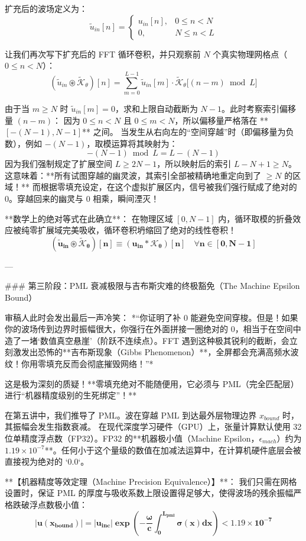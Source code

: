 \documentclass[12pt]{article}
\begin{document}
{扩充后的波场定义为：
$$
\tilde{u}_{in}[n] = 
\begin{cases} 
u_{in}[n], & 0 \le n < N \\
0, & N \le n < L 
\end{cases}
$$

让我们再次写下扩充后的 FFT 循环卷积，并只观察前 $N$ 个真实物理网格点（$0 \le n < N$）：
$$ (\tilde{u}_{in} \circledast \tilde{\mathcal{K}}_\theta)[n] = \sum_{m=0}^{L-1} \tilde{u}_{in}[m] \cdot \tilde{\mathcal{K}}_\theta\big[ (n - m) \bmod L \big] $$

由于当 $m \ge N$ 时 $\tilde{u}_{in}[m] = 0$，求和上限自动截断为 $N-1$。此时考察索引偏移量 $(n-m)$：
因为 $0 \le n < N$ 且 $0 \le m < N$，所以偏移量严格落在 **$[-(N-1), N-1]$** 之间。
当发生从右向左的“空间穿越”时（即偏移量为负数），例如 $-(N-1)$，取模运算将其映射为：
$$ -(N-1) \bmod L = L - (N-1) $$
因为我们强制规定了扩展空间 $L \ge 2N-1$，所以映射后的索引 $L - N + 1 \ge N$。这意味着：**所有试图穿越的幽灵波，其索引全部被精确地重定向到了 $\ge N$ 的区域！**
而根据零填充设定，在这个虚拟扩展区内，信号被我们强行赋成了绝对的 $0$。穿越回来的幽灵与 $0$ 相乘，瞬间湮灭！

**数学上的绝对等式在此确立**：
在物理区域 $[0, N-1]$ 内，循环取模的折叠效应被纯零扩展域完美吸收，循环卷积坍缩回了绝对的线性卷积！
$$ \mathbf{(\tilde{u}_{in} \circledast \tilde{\mathcal{K}}_\theta)[n] \equiv (u_{in} * \mathcal{K}_\theta)[n] \quad \forall n \in [0, N-1]} $$

---

### 第三阶段：PML 衰减极限与吉布斯灾难的终极豁免（The Machine Epsilon Bound）

审稿人此时会发出最后一声冷笑：
*“你证明了补 0 能避免空间穿梭。但是！如果你的波场传到边界时振幅很大，你强行在外面拼接一圈绝对的 0，相当于在空间中造了一堵‘数值真空悬崖’（阶跃不连续点）。FFT 遇到这种极其锐利的截断，会立刻激发出恐怖的**吉布斯现象（Gibbs Phenomenon）**，全屏都会充满高频水波纹！你用零填充反而会彻底摧毁网络！”*

这是极为深刻的质疑！**零填充绝对不能随便用，它必须与 PML（完全匹配层）进行“机器精度级别的生死绑定”！**

在第五讲中，我们推导了 PML。波在穿越 PML 到达最外层物理边界 $x_{bound}$ 时，其振幅会发生指数衰减。
在现代深度学习硬件（GPU）上，张量计算默认使用 32 位单精度浮点数（FP32）。FP32 的**机器极小值（Machine Epsilon，$\epsilon_{mach}$）约为 $1.19 \times 10^{-7}$**。任何小于这个量级的数值在加减法运算中，在计算机硬件底层会被直接视为绝对的 `0.0`。

**【机器精度等效定理（Machine Precision Equivalence）】**：
我们只需在网格设置时，保证 PML 的厚度与吸收系数上限设置得足够大，使得波场的残余振幅严格跌破浮点数极小值：
$$ \mathbf{|u(x_{bound})| = |u_{inc}| \exp\left( - \frac{\omega}{c} \int_0^{L_{pml}} \sigma(x) dx \right) < 1.19 \times 10^{-7}} $$

}
\end{document}
